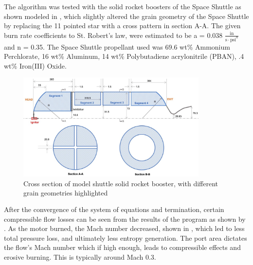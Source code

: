 The algorithm was tested with the solid rocket boosters of the Space Shuttle as shown modeled in , which slightly altered the grain geometry of the Space Shuttle by replacing the 11 pointed star with a cross pattern in section A-A. The given burn rate coefficients to St. Robert's law, were estimated to be a = 0.038 \(\frac{\textrm{in}}{\textrm{s}\cdot \textrm{psi}^n}\) and n = 0.35. The Space Shuttle propellant used was 69.6 wt\% Ammonium Perchlorate, 16 wt\% Aluminum, 14 wt\% Polybutadiene acrylonitrile (PBAN), .4 wt\% Iron(III) Oxide. 

\begin{figure}
    \centering
    \includegraphics[width=0.85\textwidth]{images/prop-grain-section}
    \caption{Cross section of model shuttle solid rocket booster, with different grain geometries highlighted}
    \label{figure:srm-cross-section}
\end{figure}

After the convergence of the system of equations and termination, certain compressible flow losses can be seen from the results of the program as shown by . As the motor burned, the Mach number decreased, shown in , which led to less total pressure loss, and ultimately less entropy generation. The port area dictates the flow's Mach number which if high enough, leads to compressible effects and erosive burning. This is typically around Mach 0.3.

